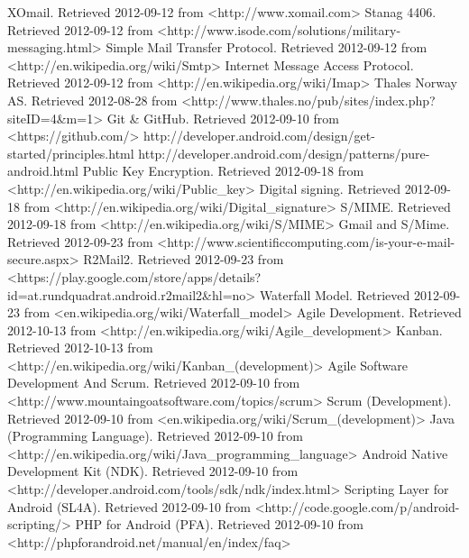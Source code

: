 \documentclass[12pt]{report}
\begin{document}
\printglossaries
{}

\begin{thebibliography}{99}
 XOmail. Retrieved 2012-09-12 from <http://www.xomail.com>
 Stanag 4406. Retrieved 2012-09-12 from <http://www.isode.com/solutions/military-messaging.html>
 Simple Mail Transfer Protocol. Retrieved 2012-09-12 from <http://en.wikipedia.org/wiki/Smtp>
 Internet Message Access Protocol. Retrieved 2012-09-12 from <http://en.wikipedia.org/wiki/Imap>
 Thales Norway AS. Retrieved 2012-08-28 from <http://www.thales.no/pub/sites/index.php?siteID=4\&m=1>
 Git \& GitHub. Retrieved 2012-09-10 from <https://github.com/>
 http://developer.android.com/design/get-started/principles.html
 http://developer.android.com/design/patterns/pure-android.html
 Public Key Encryption. Retrieved 2012-09-18 from <http://en.wikipedia.org/wiki/Public\_key>
 Digital signing. Retrieved 2012-09-18 from <http://en.wikipedia.org/wiki/Digital\_signature>
 S/MIME. Retrieved 2012-09-18 from <http://en.wikipedia.org/wiki/S/MIME>
 Gmail and S/Mime. Retrieved 2012-09-23 from <http://www.scientificcomputing.com/is-your-e-mail-secure.aspx>
 R2Mail2. Retrieved 2012-09-23 from <https://play.google.com/store/apps/details?id=at.rundquadrat.android.r2mail2\&hl=no>
 Waterfall Model. Retrieved 2012-09-23 from <en.wikipedia.org/wiki/Waterfall\_model>
 Agile Development. Retrieved 2012-10-13 from <http://en.wikipedia.org/wiki/Agile\_development>
 Kanban. Retrieved 2012-10-13 from <http://en.wikipedia.org/wiki/Kanban\_(development)>
 Agile Software Development And Scrum. Retrieved 2012-09-10 from <http://www.mountaingoatsoftware.com/topics/scrum>
 Scrum (Development). Retrieved 2012-09-10 from <en.wikipedia.org/wiki/Scrum\_(development)>
 Java (Programming Language). Retrieved 2012-09-10 from
<http://en.wikipedia.org/wiki/Java\_programming\_language>
 Android Native Development Kit (NDK). Retrieved 2012-09-10 from <http://developer.android.com/tools/sdk/ndk/index.html>
 Scripting Layer for Android (SL4A). Retrieved 2012-09-10 from <http://code.google.com/p/android-scripting/>
 PHP for Android (PFA). Retrieved 2012-09-10 from <http://phpforandroid.net/manual/en/index/faq>

\end{thebibliography}
\end{document}
